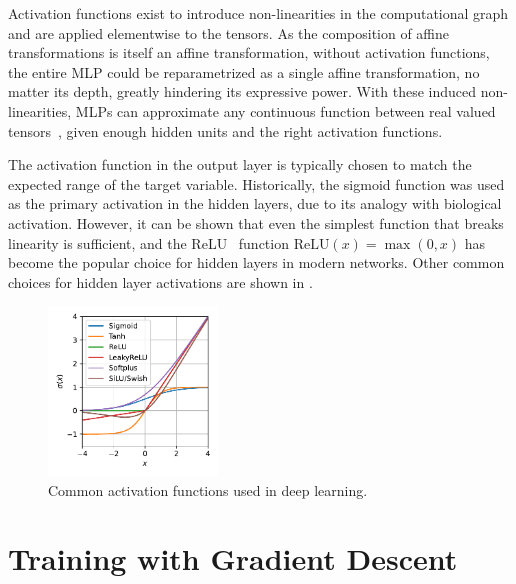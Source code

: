 Activation functions exist to introduce non-linearities in the computational graph and are applied elementwise to the tensors.
As the composition of affine transformations is itself an affine transformation, without activation functions, the entire MLP could be reparametrized as a single affine transformation, no matter its depth, greatly hindering its expressive power.
With these induced non-linearities, MLPs can approximate any continuous function between real valued tensors~\cite{ApproximationSuperpositionsSigmoidal, ApproximatingContinuousFunctions, UniversalApproximationDeep}, given enough hidden units and the right activation functions.

The activation function in the output layer is typically chosen to match the expected range of the target variable.
Historically, the sigmoid function was used as the primary activation in the hidden layers, due to its analogy with biological activation.
However, it can be shown that even the simplest function that breaks linearity is sufficient, and the ReLU~\cite{ReLU} function $\text{ReLU}(x) = \max(0, x)$ has become the popular choice for hidden layers in modern networks.
Other common choices for hidden layer activations are shown in .

\begin{figure}
    \centering
    \includegraphics[width=0.4\textwidth]{Figures/transformers/activations.pdf}
    \caption{Common activation functions used in deep learning.}
    \label{fig:activations}
\end{figure}

\section{Training with Gradient Descent}

